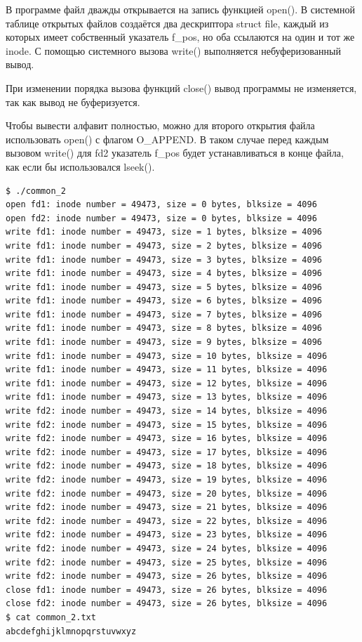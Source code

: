 \documentclass[a4paper,14pt]{extarticle}
\begin{document}
В программе файл дважды открывается на запись функцией open(). В системной таблице открытых файлов создаётся два дескриптора struct file, каждый из которых имеет собственный указатель f\_pos, но оба ссылаются на один и тот же inode. С помощью системного вызова write() выполняется небуферизованный вывод.

При изменении порядка вызова функций close() вывод программы не изменяется, так как вывод не буферизуется.

Чтобы вывести алфавит полностью, можно для второго открытия файла использовать open() с флагом O\_APPEND. В таком случае перед каждым вызовом write() для fd2 указатель f\_pos будет устанавливаться в конце файла, как если бы использовался lseek().



\begin{lstlisting}[caption={\text{Вывод программы}}]
$ ./common_2
open fd1: inode number = 49473, size = 0 bytes, blksize = 4096
open fd2: inode number = 49473, size = 0 bytes, blksize = 4096
write fd1: inode number = 49473, size = 1 bytes, blksize = 4096
write fd1: inode number = 49473, size = 2 bytes, blksize = 4096
write fd1: inode number = 49473, size = 3 bytes, blksize = 4096
write fd1: inode number = 49473, size = 4 bytes, blksize = 4096
write fd1: inode number = 49473, size = 5 bytes, blksize = 4096
write fd1: inode number = 49473, size = 6 bytes, blksize = 4096
write fd1: inode number = 49473, size = 7 bytes, blksize = 4096
write fd1: inode number = 49473, size = 8 bytes, blksize = 4096
write fd1: inode number = 49473, size = 9 bytes, blksize = 4096
write fd1: inode number = 49473, size = 10 bytes, blksize = 4096
write fd1: inode number = 49473, size = 11 bytes, blksize = 4096
write fd1: inode number = 49473, size = 12 bytes, blksize = 4096
write fd1: inode number = 49473, size = 13 bytes, blksize = 4096
write fd2: inode number = 49473, size = 14 bytes, blksize = 4096
write fd2: inode number = 49473, size = 15 bytes, blksize = 4096
write fd2: inode number = 49473, size = 16 bytes, blksize = 4096
write fd2: inode number = 49473, size = 17 bytes, blksize = 4096
write fd2: inode number = 49473, size = 18 bytes, blksize = 4096
write fd2: inode number = 49473, size = 19 bytes, blksize = 4096
write fd2: inode number = 49473, size = 20 bytes, blksize = 4096
write fd2: inode number = 49473, size = 21 bytes, blksize = 4096
write fd2: inode number = 49473, size = 22 bytes, blksize = 4096
write fd2: inode number = 49473, size = 23 bytes, blksize = 4096
write fd2: inode number = 49473, size = 24 bytes, blksize = 4096
write fd2: inode number = 49473, size = 25 bytes, blksize = 4096
write fd2: inode number = 49473, size = 26 bytes, blksize = 4096
close fd1: inode number = 49473, size = 26 bytes, blksize = 4096
close fd2: inode number = 49473, size = 26 bytes, blksize = 4096
$ cat common_2.txt
abcdefghijklmnopqrstuvwxyz
\end{lstlisting}
\end{document}
